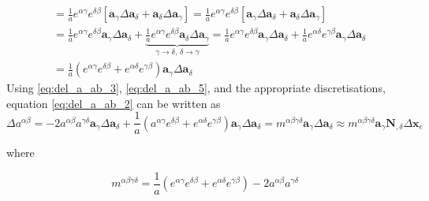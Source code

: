 \documentclass[../main.tex]{subfiles}
\begin{document}
\begin{appendices}
\begin{equation}
\begin{split}
        &= \frac{1}{a} e^{\alpha \gamma} e^{\delta \beta} \left[ \boldsymbol{a}_{\gamma} \Delta \boldsymbol{a}_{\delta} + \boldsymbol{a}_{\delta} \Delta \boldsymbol{a}_{\gamma} \right] = \frac{1}{a} e^{\alpha \gamma} e^{\delta \beta} \left[ \boldsymbol{a}_{\gamma} \Delta \boldsymbol{a}_{\delta} + \boldsymbol{a}_{\delta} \Delta \boldsymbol{a}_{\gamma} \right] \\
        &= \frac{1}{a} e^{\alpha \gamma} e^{\delta \beta} \boldsymbol{a}_{\gamma} \Delta \boldsymbol{a}_{\delta} + \underbrace{\frac{1}{a} e^{\alpha \gamma} e^{\delta \beta} \boldsymbol{a}_{\delta} \Delta \boldsymbol{a}_{\gamma}}_{\gamma \rightarrow \delta, \, \delta \rightarrow \gamma} = \frac{1}{a} e^{\alpha \gamma} e^{\delta \beta} \boldsymbol{a}_{\gamma} \Delta \boldsymbol{a}_{\delta} + \frac{1}{a} e^{\alpha \delta} e^{\gamma \beta} \boldsymbol{a}_{\gamma} \Delta \boldsymbol{a}_{\delta} \\
        &= \frac{1}{a} \left( e^{\alpha \gamma} e^{\delta \beta} + e^{\alpha \delta} e^{\gamma \beta} \right) \boldsymbol{a}_{\gamma} \Delta \boldsymbol{a}_{\delta}
    \end{split}
\end{equation}
Using \eqref{eq:del_a_ab_3}, \eqref{eq:del_a_ab_5}, and the appropriate discretisations, equation \eqref{eq:del_a_ab_2} can be written as
\begin{equation}\label{eq:del_a_ab_6}
\Delta a^{\alpha \beta} = -2 a^{\alpha \beta} a^{\gamma \delta} \boldsymbol{a}_{\gamma} \Delta \boldsymbol{a}_{\delta} + \frac{1}{a} \left( a^{\alpha \gamma} e^{\delta \beta} + e^{\alpha \delta} e^{\gamma \beta} \right) \boldsymbol{a}_{\gamma} \Delta \boldsymbol{a}_{\delta} = m^{\alpha \beta \gamma \delta} \boldsymbol{a}_{\gamma} \Delta \boldsymbol{a}_{\delta} \approx m^{\alpha \beta \gamma \delta} \boldsymbol{a}_{\gamma} \mathbf{N}_{,\delta} \Delta \mathbf{x}_{e}
\end{equation}

where

\begin{equation}\label{eq:mabgd}
m^{\alpha \beta \gamma \delta} = \frac{1}{a} \left( e^{\alpha \gamma} e^{\delta \beta} + e^{\alpha \delta} e^{\gamma \beta} \right) - 2 a^{\alpha \beta} a^{\gamma \delta}
\end{equation}


\end{appendices}
\end{document}
